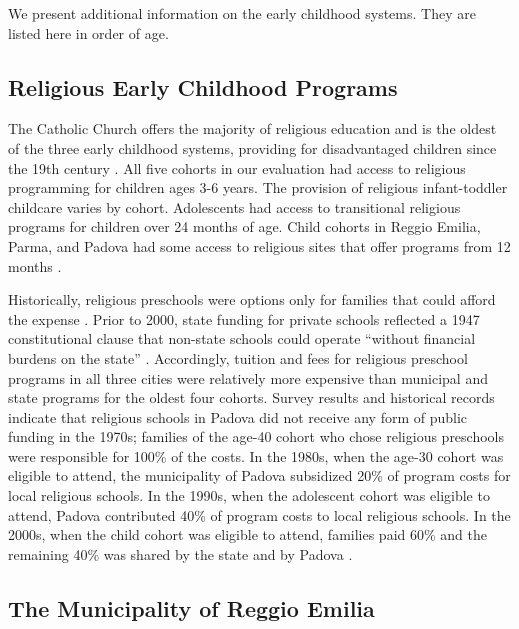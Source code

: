 We present additional information on the early childhood systems. They are listed here in order of age. 

\subsection{Religious Early Childhood Programs}

The Catholic Church offers the majority of religious education and is the oldest of the three early childhood systems, providing for disadvantaged children since the 19th century \citep{OECD_2001_Italy-Country-Note}. All five cohorts in our evaluation had access to religious programming for children ages 3-6 years. The provision of religious infant-toddler childcare varies by cohort. Adolescents had access to transitional religious programs for children over 24 months of age. Child cohorts in Reggio Emilia, Parma, and Padova had some access to religious sites that offer programs from 12 months \citep{Malizia-Cicatelli_2011_BOOK_Catholic-School}. 

Historically, religious preschools were options only for families that could afford the expense \citep{Hohnerlein_2009_Paradox-Public-Preschools,Ribolzi_2013_Italy}. Prior to 2000, state funding for private schools reflected a 1947 constitutional clause that non-state schools could operate ``without financial burdens on the state'' \citep{Hohnerlein_2009_Paradox-Public-Preschools}. Accordingly, tuition and fees for religious preschool programs in all three cities were relatively more expensive than municipal and state programs for the oldest four cohorts. Survey results and historical records indicate that religious schools in Padova did not receive any form of public funding in the 1970s; families of the age-40 cohort who chose religious preschools were responsible for 100\% of the costs. In the 1980s, when the age-30 cohort was eligible to attend, the municipality of Padova subsidized 20\% of program costs for local religious schools. In the 1990s, when the adolescent cohort was eligible to attend, Padova contributed 40\% of program costs to local religious schools. In the 2000s, when the child cohort was eligible to attend, families paid 60\% and the remaining 40\% was shared by the state and by Padova \citep{Reggio-Admin-data_1966-2006, Reggio-Annual-Journals_1994-2011, Padova-Admin-Data_1964-2011,CEHD_2016_Historical-Analysis}. 

\subsection{The Municipality of Reggio Emilia}

